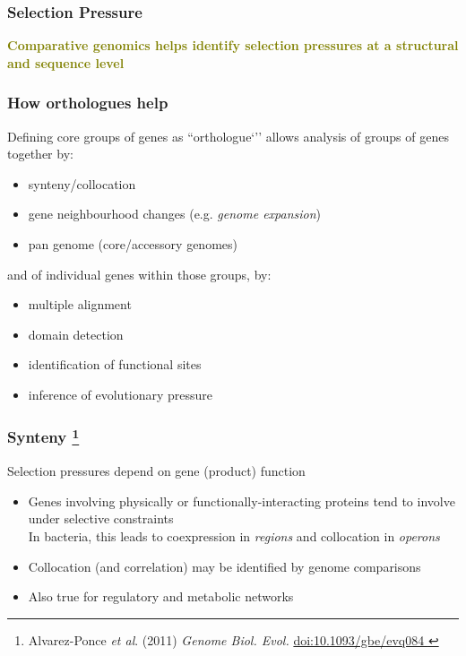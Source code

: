 
%
\begin{frame}
  \frametitle{Selection Pressure
  }
  \Large{
    \textcolor{olive}{
      \textbf{
      Comparative genomics helps identify selection pressures at a structural and sequence level
      }
    }
  }
\end{frame}

%
\begin{frame}
  \frametitle{How orthologues help}
  \textcolor{hutton_green}{Defining core groups of genes as ``orthologue`'' allows analysis of groups of genes together by:}
  \begin{itemize}
    \item \textcolor{hutton_purple}{synteny/collocation}
    \item gene neighbourhood changes (e.g. \textcolor{hutton_purple}{\textit{genome expansion}})
    \item \textcolor{hutton_purple}{pan genome (core/accessory genomes)}
  \end{itemize}
  \textcolor{hutton_blue}{and of individual genes within those groups, by:}
  \begin{itemize}
    \item multiple alignment
    \item domain detection
    \item identification of functional sites
    \item \textcolor{hutton_purple}{inference of evolutionary pressure}
  \end{itemize}  
\end{frame}

%
\begin{frame}
  \frametitle{Synteny
    \footnote{\tiny{Alvarez-Ponce \textit{et al}. (2011) \textit{Genome Biol. Evol.} \href{http://dx.doi.org/10.1093/gbe/evq084}{doi:10.1093/gbe/evq084
  }}}
}
  Selection pressures depend on gene (product) function
  \begin{itemize}
    \item \textcolor{hutton_green}{Genes involving physically or functionally-interacting proteins tend to involve under selective constraints} \\
    In bacteria, this leads to coexpression in \textit{regions} and collocation in \textit{operons}
    \item \textcolor{hutton_blue}{Collocation (and correlation) may be identified by genome comparisons}
    \item \textcolor{RawSienna}{Also true for regulatory and metabolic networks}
  \end{itemize}  
\end{frame}

